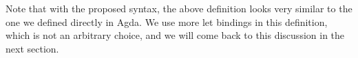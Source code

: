 \begin{code}
\AgdaSymbol{=}\AgdaSpace{}%
\AgdaSpace{}%
\AgdaSpace{}%
\AgdaInductiveConstructor{[]}\AgdaSymbol{\}}\AgdaSpace{}%
\AgdaSpace{}%
\AgdaSpace{}%
\AgdaSpace{}%
\AgdaSpace{}%
\AgdaSpace{}%
\AgdaSpace{}%
\AgdaSymbol{(}\AgdaSpace{}%
\AgdaSpace{}%
\AgdaSymbol{))}\AgdaSpace{}%
\<%
\\
%
\>[8]\AgdaSpace{}%
\AgdaSpace{}%
\AgdaFunction{:=}\AgdaSpace{}%
\AgdaSpace{}%
\AgdaSpace{}%
\AgdaSpace{}%
\AgdaSpace{}%
\<%
\\
%
\>[8]\AgdaSpace{}%
%
\>[16]\AgdaFunction{:=}\AgdaSpace{}%
\AgdaSpace{}%
\AgdaSpace{}%
\<%
\\
%
\>[8]\AgdaSpace{}%
%
\>[16]\AgdaFunction{:=}\AgdaSpace{}%
\AgdaSymbol{(}\AgdaSpace{}%
\AgdaSymbol{\{}\AgdaSpace{}%
\AgdaSymbol{=}\AgdaSpace{}%
\AgdaSpace{}%
\AgdaSpace{}%
\AgdaSpace{}%
\AgdaSpace{}%
\AgdaInductiveConstructor{[]}\AgdaSymbol{\}}\AgdaSpace{}%
\AgdaSpace{}%
\AgdaSpace{}%
\AgdaSpace{}%
\AgdaSpace{}%
\AgdaSpace{}%
\AgdaSpace{}%
\AgdaSymbol{(}\AgdaSpace{}%
\AgdaSpace{}%
\AgdaSymbol{))}\AgdaSpace{}%
\<%
\\
%
\>[8]\AgdaSpace{}%
%
\>[16]\AgdaFunction{:=}\AgdaSpace{}%
\AgdaSpace{}%
\AgdaSpace{}%
\AgdaSpace{}%
\AgdaSpace{}%
\<%
\\
%
\>[8]\AgdaSpace{}%
%
\>[16]\AgdaFunction{:=}\AgdaSpace{}%
\AgdaSpace{}%
\AgdaSpace{}%
\<%
\\
%
\>[8]\AgdaSpace{}%
%
\>[16]\AgdaFunction{:=}\AgdaSpace{}%
\AgdaSpace{}%
\AgdaSpace{}%
\AgdaSpace{}%
\<%
\\
%
\>[8]\<%
\end{code}
Note that with the proposed syntax, the above definition looks very similar
to the one we defined directly in Agda.  We use more let bindings in this
definition, which is not an arbitrary choice, and we will come back to this
discussion in the next section.

